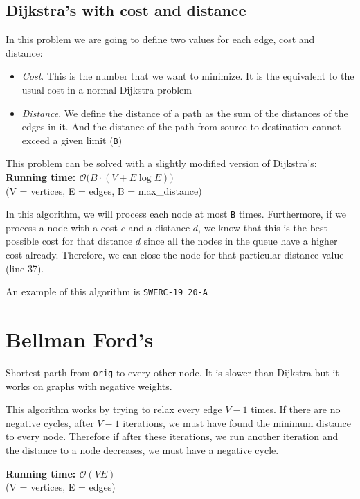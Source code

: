 \subsection{Dijkstra's with cost and distance}
\label{graph:dijkstra:distances}
In this problem we are going to define two values for each edge, cost and distance:
\begin{itemize}
	\setlength\itemsep{0 pt}
	\item \textit{Cost}. This is the number that we want to minimize. It is the 
		equivalent to the usual cost in a normal Dijkstra problem
	\item \textit{Distance}. We define the distance of a path as the sum of the
		distances of the edges in it. And the distance of the path from source
		to destination cannot exceed a given limit (\texttt{B})
\end{itemize}
This problem can be solved with a slightly modified version of Dijkstra's:
\noindent \textbf{\boldmath Running time: $\mathcal{O}\big(B\cdot(V+E\log E)\big)$}
\\ {\small(V = vertices, E = edges, B = max\_distance)}

In this algorithm, we will process each node at most \texttt{B} times. Furthermore, 
if we process a node with a cost $c$ and a distance $d$, we know that this is the 
best possible cost for that distance $d$ since all the nodes in the queue have a higher
cost already. Therefore, we can close the node for that particular distance value (line 37).

An example of this algorithm is \texttt{SWERC-19\_20-A}



\section{Bellman Ford's}
Shortest parth from \texttt{orig} to every other node. It is slower than Dijkstra but 
it works on graphs with negative weights. 

This algorithm works by trying to relax every edge $V-1$ times. If there are no 
negative cycles, after $V-1$ iterations, we must have found the minimum distance
to every node. Therefore if after these iterations, we run another
iteration and the distance to a node decreases, we must have a negative cycle.

\noindent \textbf{\boldmath Running time: $\mathcal{O}(VE)$}
\\ {\small(V = vertices, E = edges)}
